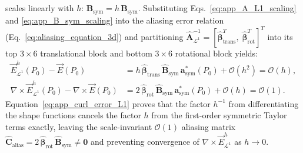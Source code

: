 \documentclass[preprint,12pt]{elsarticle}
\newcommand{\curl}{\nabla \times}
\begin{document}
scales linearly with $h$: $\mathbf{B}_{\text{sym}} = h\,\widehat{\mathbf{B}}_{\text{sym}}$. Substituting Eqs.~\eqref{eq:app_A_L1_scaling} and \eqref{eq:app_B_sym_scaling} into the aliasing error relation (Eq.~\eqref{eq:aliasing_equation_3d}) and partitioning $\widehat{\mathbf{A}}_{\mathcal{L}^1}^{-1} = [\widehat{\bm{\beta}}_{\text{trans}}^T, \; \widehat{\bm{\beta}}_{\text{rot}}^T]^T$ into its top $3\times 6$ translational block and bottom $3\times 6$ rotational block yields:
\begin{align}
    \vec{E}^h_{\mathcal{L}^1}(P_0) - \vec{E}(P_0) &= h\,\widehat{\bm{\beta}}_{\text{trans}}\,\widehat{\mathbf{B}}_{\text{sym}}\,\mathbf{a}_{\text{sym}}^*(P_0) + \mathcal{O}(h^2) = \mathcal{O}(h), \label{eq:app_E_error_L1} \\
    \curl\vec{E}^h_{\mathcal{L}^1}(P_0) - \curl\vec{E}(P_0) &= 2\,\widehat{\bm{\beta}}_{\text{rot}}\,\widehat{\mathbf{B}}_{\text{sym}}\,\mathbf{a}_{\text{sym}}^*(P_0) + \mathcal{O}(h) = \mathcal{O}(1). \label{eq:app_curl_error_L1}
\end{align}
Equation~\eqref{eq:app_curl_error_L1} proves that the factor $h^{-1}$ from differentiating the shape functions cancels the factor $h$ from the first-order symmetric Taylor terms exactly, leaving the scale-invariant $\mathcal{O}(1)$ aliasing matrix $\widehat{\mathbf{C}}_{\text{alias}} = 2\,\widehat{\bm{\beta}}_{\text{rot}}\,\widehat{\mathbf{B}}_{\text{sym}} \neq \mathbf{0}$ and preventing convergence of $\curl\vec{E}^h_{\mathcal{L}^1}$ as $h \to 0$.



\end{document}
